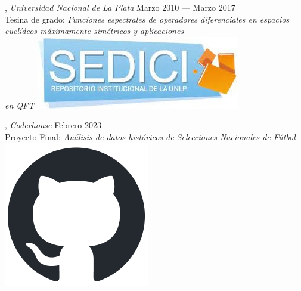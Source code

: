
, \textit{Universidad Nacional de La Plata}	\hfill Marzo 2010 --- Marzo 2017
\\ \hspace{0.3cm}  Tesina de grado: \textit{Funciones espectrales de operadores diferenciales en espacios euclídeos máximamente simétricos y aplicaciones
\\ \hspace{0.3cm} en QFT} \hspace{0.1 cm} \href{http://sedici.unlp.edu.ar/handle/10915/77384}{\includegraphics[scale=0.08]{sedici.jpg}}

\vspace{0.1 cm}

, \textit{Coderhouse} \hfill	Febrero 2023
\\ \hspace{0.3 cm}  Proyecto Final: \textit{Análisis de datos históricos de Selecciones Nacionales de Fútbol} \hspace{0.1 cm} \href{https://github.com/juanjogervasio/Data-Analytics-Coderhouse}{\includegraphics[scale=0.2]{github-mark.png}}

